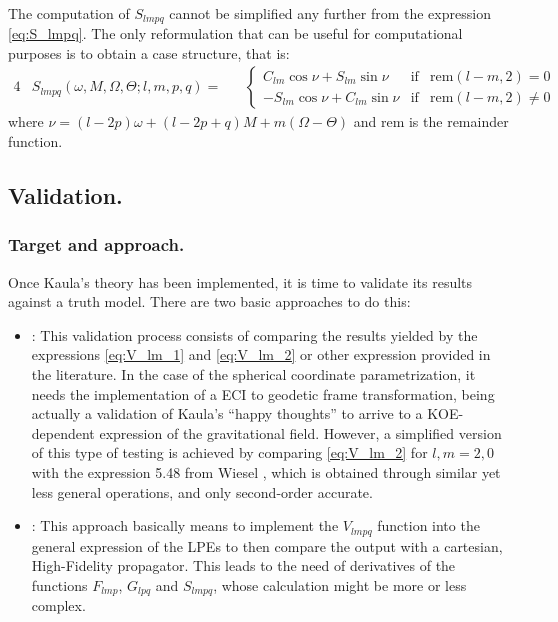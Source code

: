			\paragraph{  \\}
			\indent The computation of $S_{lmpq}$ cannot be simplified any further from the expression \eqref{eq:S_lmpq}. The only reformulation that can be useful for computational purposes is to obtain a case structure, that is:
			\begin{alignat}{4}
			& \label{eq:S_lmpq_mod} S_{lmpq} (\omega, M, \Omega, \Theta; l, m, p, q) = && \left\{ \begin{array}{ccc}
			C_{lm} \cos \nu	 + S_{lm} \sin \nu & \text{if} & \text{rem}(l - m, 2) = 0\\ [1em]
	 		-S_{lm} \cos \nu + C_{lm} \sin \nu & \text{if} & \text{rem}(l - m, 2)  \neq 0	
			\end{array}\right.
			\end{alignat}
			\noindent where $\nu = (l - 2p)\omega + (l - 2p + q)M + m (\Omega - \Theta)$ and rem is the remainder function.
		\subsection{Validation.}
			\subsubsection{Target and approach.}
			\indent Once Kaula's theory has been implemented, it is time to validate its results against a truth model. There are two basic approaches to do this:
			\begin{itemize}
			\item[\GMVred{A.}]: This validation process consists of comparing the results yielded by the expressions \eqref{eq:V_lm_1} and \eqref{eq:V_lm_2} or other expression provided in the literature. In the case of the spherical coordinate parametrization, it needs the implementation of a ECI to geodetic frame transformation, being actually a validation of Kaula's ``happy thoughts'' to arrive to a KOE-dependent expression of the gravitational field. However, a simplified version of this type of testing is achieved by comparing \eqref{eq:V_lm_2} for $l,m = 2,0$ with the expression 5.48 from Wiesel \cite{Wiesel}, which is obtained through similar yet less general operations, and only second-order accurate.
			\item[\GMVred{B.}]: This approach basically means to implement the $V_{lmpq}$ function into the general expression of the LPEs to then compare the output with a cartesian, High-Fidelity propagator. This leads to the need of derivatives of the functions $F_{lmp}$, $G_{lpq}$ and $S_{lmpq}$, whose calculation might be more or less complex.
			\end{itemize}
